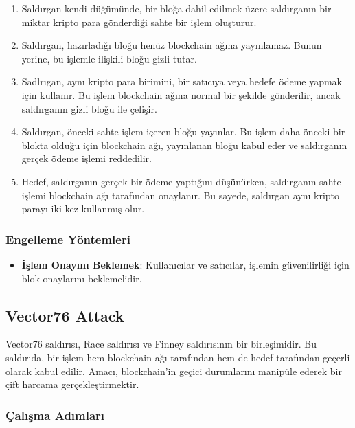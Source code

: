 \begin{enumerate}
    \item Saldırgan kendi düğümünde, bir bloğa dahil edilmek üzere saldırganın bir miktar kripto para gönderdiği sahte bir işlem oluşturur.
    \item Saldırgan, hazırladığı bloğu henüz blockchain ağına yayınlamaz. Bunun yerine, bu işlemle ilişkili bloğu gizli tutar.
    \item Sadlrıgan, aynı kripto para birimini, bir satıcıya veya hedefe ödeme yapmak için kullanır. Bu işlem blockchain ağına normal bir şekilde gönderilir, ancak saldırganın gizli bloğu ile çelişir.
    \item Saldırgan, önceki sahte işlem içeren bloğu yayınlar. Bu işlem daha önceki bir blokta olduğu için blockchain ağı, yayınlanan bloğu kabul eder ve saldırganın gerçek ödeme işlemi reddedilir.
    \item Hedef, saldırganın gerçek bir ödeme yaptığını düşünürken, saldırganın sahte işlemi blockchain ağı tarafından onaylanır. Bu sayede, saldırgan aynı kripto parayı iki kez kullanmış olur.
\end{enumerate}

\subsubsection{Engelleme Yöntemleri}

\begin{itemize}
    \item \textbf{İşlem Onayını Beklemek}: Kullanıcılar ve satıcılar, işlemin güvenilirliği için blok onaylarını beklemelidir.
\end{itemize}

\newpage

\subsection{Vector76 Attack}

Vector76 saldırısı, Race saldırısı ve Finney saldırısının bir birleşimidir. Bu saldırıda, bir işlem hem blockchain ağı tarafından hem de hedef tarafından geçerli olarak kabul edilir. Amacı, blockchain'in geçici durumlarını manipüle ederek bir çift harcama gerçekleştirmektir.

\subsubsection{Çalışma Adımları}

